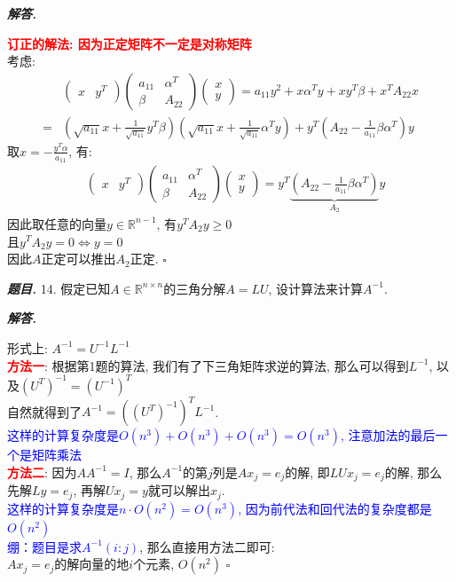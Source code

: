 \documentclass[10pt, a4paper, oneside]{ctexart}
\newenvironment{problem}{\begin{framed}\par\noindent\textbf{\textit{题目. }}}{\end{framed}\par}
\newenvironment{solution}{%
  \par\noindent\textbf{\textit{解答. }}\ignorespaces
}{%
  \hfill\ensuremath{\square}\par %
}
\begin{document}
\begin{solution}
\textcolor{red}{\textbf{订正的解法: 因为正定矩阵不一定是对称矩阵}}\\
考虑:
\begin{align*}
    &\begin{pmatrix}
        x&y^T
    \end{pmatrix} \begin{pmatrix}
        a_{11} & \alpha^T \\ \beta & A_{22} 
    \end{pmatrix} \begin{pmatrix}
        x\\y
    \end{pmatrix}=a_{11}y^2+ x\alpha^Ty+ xy^T\beta +x^TA_{22}x\\
    =& (\sqrt{a_{11}}x + \frac{1}{\sqrt{a_{11}}} y^T\beta )(\sqrt{a_{11}}x + \frac{1}{\sqrt{a_{11}}} \alpha^Ty ) + y^T(A_{22}- \frac{1}{a_{11}} \beta \alpha^T)y
\end{align*} 
取$x = - \frac{y^T\alpha}{a_{11}}$, 有:
\begin{align*}
    &\begin{pmatrix}
        x&y^T
    \end{pmatrix} \begin{pmatrix}
        a_{11} & \alpha^T \\ \beta & A_{22} 
    \end{pmatrix} \begin{pmatrix}
        x\\y
    \end{pmatrix} = y^T\underbrace{(A_{22}- \frac{1}{a_{11}} \beta \alpha^T)}_{A_2}y
\end{align*}
因此取任意的向量$y\in \mathbb{R}^{n-1}$, 有$y^TA_{2}y\geq 0$\\
且$y^TA_{2}y=0\iff y=0$\\
因此$A$正定可以推出$A_2$正定.
\end{solution}

\begin{problem}
14. 假定已知$A\in \mathbb{R}^{n\times n}$的三角分解$A=LU$, 设计算法来计算$A^{-1}$.
\end{problem}
\begin{solution}
形式上: $A^{-1} = U^{-1} L^{-1}$\\
\textcolor{red}{\textbf{方法一}}: 根据第1题的算法, 我们有了下三角矩阵求逆的算法, 那么可以得到$L^{-1}$, 以及$(U^{T})^{-1}=(U^{-1})^T$\\自然就得到了$A^{-1} = ((U^{T})^{-1})^T L^{-1}$.\\\textcolor{blue}{这样的计算复杂度是$O(n^3)+O(n^3)+O(n^3)=O(n^3)$, 注意加法的最后一个是矩阵乘法}\\
\textcolor{red}{\textbf{方法二}}: 因为$AA^{-1}=I$, 那么$A^{-1}$的第$j$列是$Ax_j=e_j$的解, 即$LUx_j=e_j$的解, 那么先解$Ly=e_j$, 再解$Ux_j=y$就可以解出$x_j$.\\
\textcolor{blue}{这样的计算复杂度是$n\cdot O(n^2) = O(n^3)$, 因为前代法和回代法的复杂度都是$O(n^2)$}\\
\textcolor{blue}{绷：题目是求$A^{-1}(i:j)$}, 那么直接用方法二即可:\\
$Ax_j=e_j$的解向量的地$i$个元素, $O(n^2)$
\end{solution}
\end{document}
